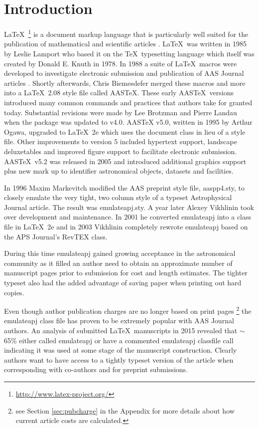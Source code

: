 \documentclass[linenumbers]{aastex631}
\newcommand\aastex{AAS\TeX}
\newcommand\latex{La\TeX}
\begin{document}
\section{Introduction} \label{sec:intro}

\latex\ \footnote{\url{http://www.latex-project.org/}} is a document markup
language that is particularly well suited for the publication of
mathematical and scientific articles \citep{lamport94}. \latex\ was written
in 1985 by Leslie Lamport who based it on the \TeX\ typesetting language
which itself was created by Donald E. Knuth in 1978.  In 1988 a suite of
\latex\ macros were developed to investigate electronic submission and
publication of AAS Journal articles \citep{1989BAAS...21..780H}.  Shortly
afterwards, Chris Biemesdefer merged these macros and more into a \latex\
2.08 style file called \aastex.  These early \aastex\ versions introduced
many common commands and practices that authors take for granted today.
Substantial revisions
were made by Lee Brotzman and Pierre Landau when the package was updated to
v4.0.  AASTeX v5.0, written in 1995 by Arthur Ogawa, upgraded to \latex\ 2e
which uses the document class in lieu of a style file.  Other improvements
to version 5 included hypertext support, landscape deluxetables and
improved figure support to facilitate electronic submission.  
\aastex\ v5.2 was released in 2005 and introduced additional graphics
support plus new mark up to identifier astronomical objects, datasets and
facilities.

In 1996 Maxim Markevitch modified the AAS preprint style file, aaspp4.sty,
to closely emulate the very tight, two column style of a typeset
Astrophysical Journal article.  The result was emulateapj.sty.  A year
later Alexey Vikhlinin took over development and maintenance.  In 2001 he
converted emulateapj into a class file in \latex\ 2e and in 2003 Vikhlinin
completely rewrote emulateapj based on the APS Journal's RevTEX class.

During this time emulateapj gained growing acceptance in the astronomical
community as it filled an author need to obtain an approximate number of
manuscript pages prior to submission for cost and length estimates. The
tighter typeset also had the added advantage of saving paper when printing
out hard copies.

Even though author publication charges are no longer based on print pages
\footnote{see Section \ref{sec:pubcharge} in the Appendix for more details
about how current article costs are calculated.} the emulateapj class file
has proven to be extremely popular with AAS Journal authors.  An 
analysis of submitted \latex\ manuscripts in 2015 revealed that $\sim$65\%
either called emulateapj or have a commented emulateapj classfile call
indicating it was used at some stage of the manuscript construction.
Clearly authors want to have access to a tightly typeset version of the
article when corresponding with co-authors and for preprint submissions.
\end{document}
